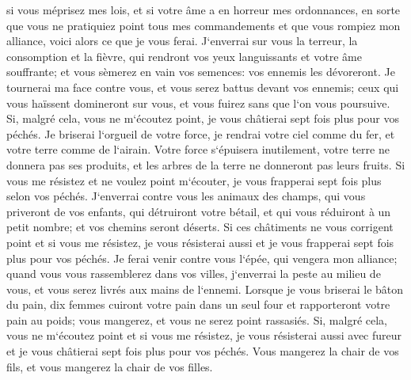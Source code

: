 \verse si vous méprisez mes lois, et si votre âme a en horreur mes ordonnances, en sorte que vous ne pratiquiez point tous mes commandements et que vous rompiez mon alliance, 
\verse voici alors ce que je vous ferai. J`enverrai sur vous la terreur, la consomption et la fièvre, qui rendront vos yeux languissants et votre âme souffrante; et vous sèmerez en vain vos semences: vos ennemis les dévoreront. 
\verse Je tournerai ma face contre vous, et vous serez battus devant vos ennemis; ceux qui vous haïssent domineront sur vous, et vous fuirez sans que l`on vous poursuive. 
\verse Si, malgré cela, vous ne m`écoutez point, je vous châtierai sept fois plus pour vos péchés. 
\verse Je briserai l`orgueil de votre force, je rendrai votre ciel comme du fer, et votre terre comme de l`airain. 
\verse Votre force s`épuisera inutilement, votre terre ne donnera pas ses produits, et les arbres de la terre ne donneront pas leurs fruits. 
\verse Si vous me résistez et ne voulez point m`écouter, je vous frapperai sept fois plus selon vos péchés. 
\verse J`enverrai contre vous les animaux des champs, qui vous priveront de vos enfants, qui détruiront votre bétail, et qui vous réduiront à un petit nombre; et vos chemins seront déserts. 
\verse Si ces châtiments ne vous corrigent point et si vous me résistez, 
\verse je vous résisterai aussi et je vous frapperai sept fois plus pour vos péchés. 
\verse Je ferai venir contre vous l`épée, qui vengera mon alliance; quand vous vous rassemblerez dans vos villes, j`enverrai la peste au milieu de vous, et vous serez livrés aux mains de l`ennemi. 
\verse Lorsque je vous briserai le bâton du pain, dix femmes cuiront votre pain dans un seul four et rapporteront votre pain au poids; vous mangerez, et vous ne serez point rassasiés. 
\verse Si, malgré cela, vous ne m`écoutez point et si vous me résistez, 
\verse je vous résisterai aussi avec fureur et je vous châtierai sept fois plus pour vos péchés. 
\verse Vous mangerez la chair de vos fils, et vous mangerez la chair de vos filles. 
